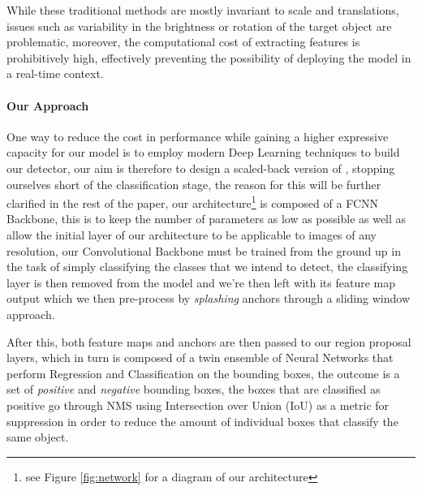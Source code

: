\documentclass[10pt,journal,cspaper,compsoc]{IEEEtran}
\begin{document}
    While these traditional methods are mostly invariant to scale and translations, issues such as 
    variability in the brightness or rotation of the target object are problematic, moreover, the 
    computational cost of extracting features is prohibitively high, effectively preventing the possibility
    of deploying the model in a real-time context.

    \paragraph*{Our Approach}
    One way to reduce the cost in performance while gaining a higher expressive capacity for our model is to employ
    modern Deep Learning techniques to build our detector, our aim is therefore to 
    design a scaled-back version of \cite{arxiv:FasterRCNN}, stopping ourselves short of the classification stage,
    the reason for this will be further clarified in the rest of the paper, our architecture\footnote{see 
    Figure \ref{fig:network} for a diagram
    of our architecture} is composed of a FCNN\cite{Chen:FCNN,Simonyan:VCC16} Backbone, this is to keep the number 
    of parameters as low as possible as well as allow the initial layer of our architecture to be applicable to images 
    of any resolution, our Convolutional Backbone must be trained from the ground up in the task of simply classifying 
    the classes that we intend to detect, the classifying layer is then removed from the model and we're then
    left with its feature map output which we then pre-process by \emph{splashing} anchors through a sliding window 
    approach.

        

    After this, both feature maps and anchors are then passed to our region proposal layers, which in turn is composed 
    of a twin ensemble of Neural Networks that perform Regression and Classification on the bounding boxes, the outcome is a set of 
    \emph{positive} and \emph{negative} bounding boxes, the boxes that are classified as positive 
    go through NMS\cite{Neubeck:NMS} using Intersection over Union (IoU) \cite{Rezatofighi:IoU} as a metric for suppression
    in order to reduce the amount of individual boxes that classify the same object.

    
\end{document}
